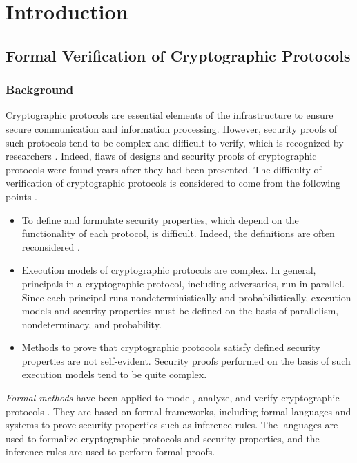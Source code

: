 \chapter{Introduction}
\section{Formal Verification of Cryptographic Protocols}
\subsection{Background}
Cryptographic protocols are essential elements of the infrastructure
to ensure secure communication and information processing. However,
security proofs of such protocols tend to be complex and
difficult to verify, which is recognized by researchers 
\cite{Shoup2004, Halevi2005, Canetti2006}.
Indeed, flaws of designs \cite{Lowe1996,
Bleichenbacher1998, Cervesato2008}
and security proofs \cite{Shoup2001oaep, Galindo2005} of
cryptographic protocols
were found years after they had been presented.
The difficulty of verification of cryptographic protocols 
is considered to come from the following points \cite{Ouyousuuri2010}.
\begin{itemize}
 \item To define and formulate security properties, which depend on 
       the functionality of each protocol, is difficult.
       Indeed, the definitions are often reconsidered
       \cite{GoldwasserMicali1984,
       DolevDworkNaor2003, RackoffSimon1992,
       Benalohetal1994, Juelsetal2005}.
 \item Execution models of cryptographic protocols
       are complex. In general, principals in a cryptographic
       protocol, including adversaries,
       run in parallel. Since each principal runs
       nondeterministically and probabilistically,
       execution models and security properties must be
       defined on the basis of parallelism, nondeterminacy, and
       probability.
 \item Methods to prove that cryptographic protocols satisfy defined
       security properties are not self-evident.
       Security proofs performed on the basis of such execution
       models tend to be quite complex.
\end{itemize}
{\it Formal methods} have been applied
to model, analyze, and verify cryptographic protocols
\cite{Blanchet2001, Armando2005, Blanchet2008cryptoverif,
Barthe2009certi, Barthe2011}.
They are based on formal frameworks, including formal
languages and systems to prove security properties such as
inference rules.
The languages are used to formalize cryptographic protocols and
security properties, and the inference rules are used to perform 
formal proofs.

